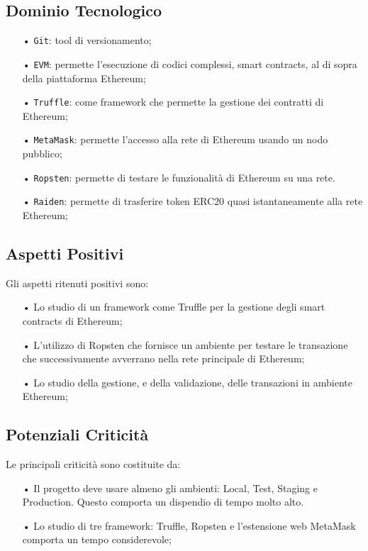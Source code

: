 \subsection{Dominio Tecnologico}
\begin{itemize}

\item[•] \texttt{Git}: tool di versionamento;
\item[•] \texttt{EVM}: permette l’esecuzione di codici complessi, smart contracts, al di sopra della piattaforma Ethereum;
\item[•] \texttt{Truffle}: come framework che permette la gestione dei contratti di Ethereum;
\item[•] \texttt{MetaMask}: 
permette l'accesso alla rete di Ethereum usando un nodo pubblico; 
\item[•] \texttt{Ropsten}: permette di testare le funzionalità di Ethereum su una rete. 
\item[•] \texttt{Raiden}: permette di trasferire token ERC20 quasi istantaneamente alla rete Ethereum;  

\end{itemize}

\subsection{Aspetti Positivi}

Gli aspetti ritenuti positivi sono: 
\begin{itemize}

\item[•] Lo studio di un framework come Truffle per la gestione degli smart contracts di Ethereum;
\item[•] L'utilizzo di Ropsten che fornisce un ambiente per testare le transazione che successivamente avverrano nella rete principale di Ethereum;
\item[•] Lo studio della gestione, e della validazione, delle transazioni in ambiente Ethereum; 

\end{itemize}

\subsection{Potenziali Criticità}
Le principali criticità sono costituite da: 
\begin{itemize}

\item[•] Il progetto deve usare almeno gli ambienti: Local, Test, Staging e Production. Questo comporta un dispendio di tempo molto alto. 

\item[•] Lo studio di tre framework: Truffle, Ropsten e l'estensione web MetaMask comporta un tempo considerevole;

\end{itemize}


